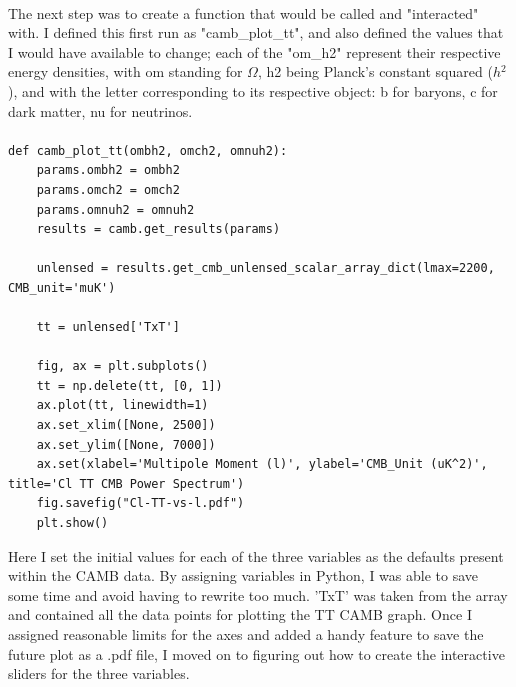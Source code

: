 \documentclass[twoside, fontsize=12pt,
     bibliography=totoc, %
     listof=totoc, %
     index=totoc, %
     onehalfspacing %
]{_MScDiss2017_cls}
\begin{document}
\paragraph{}

The next step was to create a function that would be called and "interacted" with. I defined this first run as "camb\_plot\_tt", and also defined the values that I would have available to change; each of the "om\_h2" represent their respective energy densities, with om standing for $\Omega$, h2 being Planck's constant squared ($h$$^2$), and with the letter corresponding to its respective object: b for baryons, c for dark matter, nu for neutrinos.

\paragraph{}

\begin{lstfloat}
\begin{lstlisting}[caption={Initialising the first plot}, captionpos=b]
%matplotlib inline
def camb_plot_tt(ombh2, omch2, omnuh2):
    params.ombh2 = ombh2
    params.omch2 = omch2
    params.omnuh2 = omnuh2
    results = camb.get_results(params)

    unlensed = results.get_cmb_unlensed_scalar_array_dict(lmax=2200, CMB_unit='muK')

    tt = unlensed['TxT']

    fig, ax = plt.subplots()
    tt = np.delete(tt, [0, 1])
    ax.plot(tt, linewidth=1)
    ax.set_xlim([None, 2500])
    ax.set_ylim([None, 7000])
    ax.set(xlabel='Multipole Moment (l)', ylabel='CMB_Unit (uK^2)', title='Cl TT CMB Power Spectrum')
    fig.savefig("Cl-TT-vs-l.pdf")
    plt.show()

\end{lstlisting}
\end{lstfloat}


Here I set the initial values for each of the three variables as the defaults present within the CAMB data. By assigning variables in Python, I was able to save some time and avoid having to rewrite too much. 'TxT' was taken from the array and contained all the data points for plotting the TT CAMB graph. Once I assigned reasonable limits for the axes and added a handy feature to save the future plot as a .pdf file, I moved on to figuring out how to create the interactive sliders for the three variables.
\end{document}
